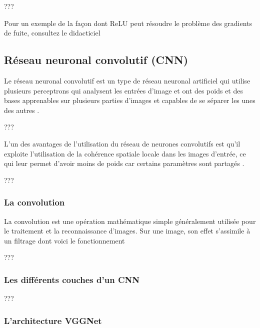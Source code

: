 	???
	
	Pour un exemple de la façon dont ReLU peut résoudre le problème des gradients de fuite, consultez le didacticiel 


	
	
	\subsection{Réseau neuronal convolutif (CNN)}
	
	Le réseau neuronal convolutif est un type de réseau neuronal artificiel qui utilise plusieurs perceptrons qui analysent les entrées d'image et ont des poids et des bases apprenables sur plusieurs parties d'images et capables de se séparer les unes des autres \cite{tammina2019transfer}.
	
	???
	
	L'un des avantages de l'utilisation du réseau de neurones convolutifs est qu'il exploite l'utilisation de la cohérence spatiale locale dans les images d'entrée, ce qui leur permet d'avoir moins de poids car certains paramètres sont partagés \cite{tammina2019transfer}.
	
	
	???
	\cite{shin2016deep} 
	
	\subsubsection{La convolution}
	
	La convolution est une opération mathématique simple généralement utilisée pour le traitement et la reconnaissance d’images. Sur une image, son effet s’assimile à un filtrage dont voici le fonctionnement
	
	??? 
	
	\subsubsection{Les différents couches d'un CNN}
	???
	
	\subsubsection{L'architecture VGGNet}
	
